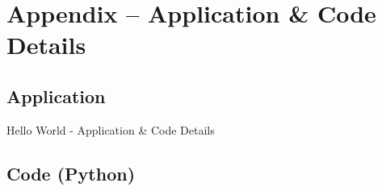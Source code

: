 \section{Appendix -- Application \& Code Details}
\subsection{Application}
Hello World - Application \& Code Details

\subsection{Code (Python)}


\clearpage